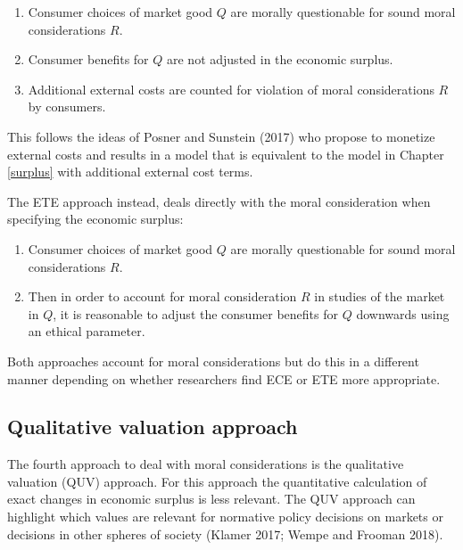 \documentclass[
]{book}
\providecommand{\tightlist}{%
  \setlength{\itemsep}{0pt}\setlength{\parskip}{0pt}}
\begin{document}
\begin{enumerate}
\def\labelenumi{(\Alph{enumi})}
\tightlist
\item
  Consumer choices of market good \(Q\) are morally questionable for sound moral considerations \(R\).
\item
  Consumer benefits for \(Q\) are not adjusted in the economic surplus.
\item
  Additional external costs are counted for violation of moral considerations \(R\) by consumers.
\end{enumerate}

This follows the ideas of Posner and Sunstein (2017) who propose to monetize external costs and results in a model that is equivalent to the model in Chapter \ref{surplus} with additional external cost terms.

The ETE approach instead, deals directly with the moral consideration when specifying the economic surplus:

\begin{enumerate}
\def\labelenumi{(\Alph{enumi})}
\tightlist
\item
  Consumer choices of market good \(Q\) are morally questionable for sound moral considerations \(R\).
\item
  Then in order to account for moral consideration \(R\) in studies of the market in \(Q\), it is reasonable to adjust the consumer benefits for \(Q\) downwards using an ethical parameter.
\end{enumerate}

Both approaches account for moral considerations but do this in a different manner depending on whether researchers find ECE or ETE more appropriate.

\hypertarget{qualitative-valuation-approach}{%
\subsection{Qualitative valuation approach}\label{qualitative-valuation-approach}}

The fourth approach to deal with moral considerations is the qualitative valuation (QUV) approach. For this approach the quantitative calculation of exact changes in economic surplus is less relevant. The QUV approach can highlight which values are relevant for normative policy decisions on markets or decisions in other spheres of society (Klamer 2017; Wempe and Frooman 2018).
\end{document}
